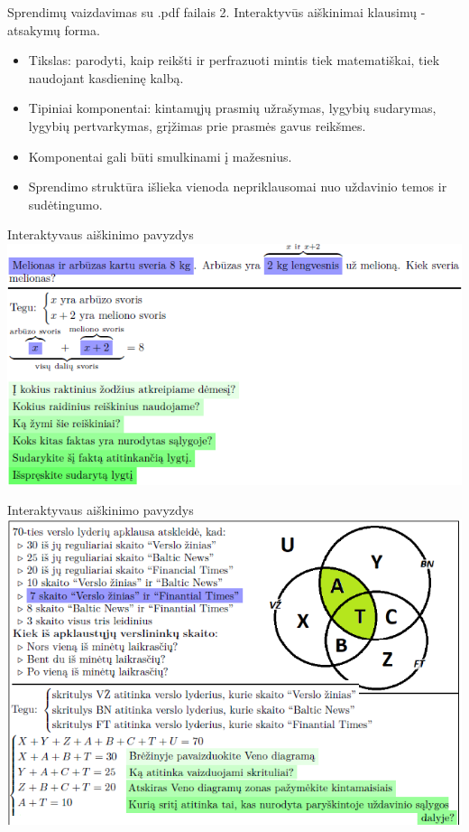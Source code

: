 \documentclass{beamer}
\begin{document}
\begin{frame}[fragile]{Sprendimų vaizdavimas su .pdf failais}
2. Interaktyvūs aiškinimai klausimų - atsakymų forma.
\begin{itemize}
\item Tikslas: parodyti, kaip reikšti ir perfrazuoti mintis tiek matematiškai, tiek naudojant kasdieninę kalbą.
\item Tipiniai komponentai: kintamųjų prasmių užrašymas, lygybių sudarymas, lygybių pertvarkymas, grįžimas prie prasmės gavus reikšmes.
\item Komponentai gali būti smulkinami į mažesnius.
\item Sprendimo struktūra išlieka vienoda nepriklausomai nuo uždavinio temos ir sudėtingumo.
\end{itemize}
\end{frame}

\begin{frame}[fragile]{Interaktyvaus aiškinimo pavyzdys}
\includegraphics[width = \textwidth]{zodiniai.png}
\end{frame}

\begin{frame}[fragile]{Interaktyvaus aiškinimo pavyzdys}
\includegraphics[width = \textwidth]{zodiniai2.png}
\end{frame}
\end{document}
